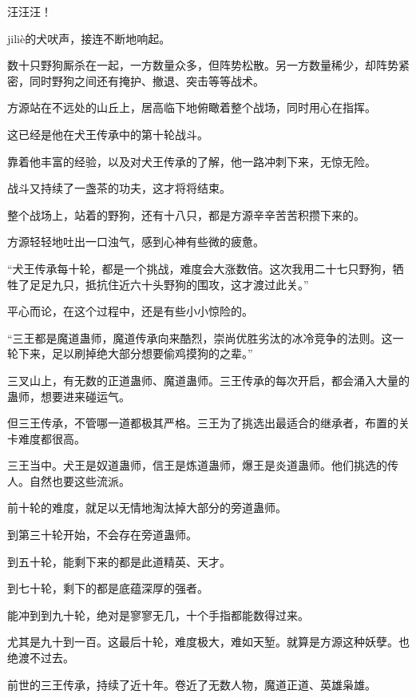 
\begin{this_body}

汪汪汪！

jiliè的犬吠声，接连不断地响起。

数十只野狗厮杀在一起，一方数量众多，但阵势松散。另一方数量稀少，却阵势紧密，同时野狗之间还有掩护、撤退、突击等等战术。

方源站在不远处的山丘上，居高临下地俯瞰着整个战场，同时用心在指挥。

这已经是他在犬王传承中的第十轮战斗。

靠着他丰富的经验，以及对犬王传承的了解，他一路冲刺下来，无惊无险。

战斗又持续了一盏茶的功夫，这才将将结束。

整个战场上，站着的野狗，还有十八只，都是方源辛辛苦苦积攒下来的。

方源轻轻地吐出一口浊气，感到心神有些微的疲惫。

“犬王传承每十轮，都是一个挑战，难度会大涨数倍。这次我用二十七只野狗，牺牲了足足九只，抵抗住近六十头野狗的围攻，这才渡过此关。”

平心而论，在这个过程中，还是有些小小惊险的。

“三王都是魔道蛊师，魔道传承向来酷烈，崇尚优胜劣汰的冰冷竞争的法则。这一轮下来，足以刷掉绝大部分想要偷鸡摸狗的之辈。”

三叉山上，有无数的正道蛊师、魔道蛊师。三王传承的每次开启，都会涌入大量的蛊师，想要进来碰运气。

但三王传承，不管哪一道都极其严格。三王为了挑选出最适合的继承者，布置的关卡难度都很高。

三王当中。犬王是奴道蛊师，信王是炼道蛊师，爆王是炎道蛊师。他们挑选的传人。自然也要这些流派。

前十轮的难度，就足以无情地淘汰掉大部分的旁道蛊师。

到第三十轮开始，不会存在旁道蛊师。

到五十轮，能剩下来的都是此道精英、天才。

到七十轮，剩下的都是底蕴深厚的强者。

能冲到到九十轮，绝对是寥寥无几，十个手指都能数得过来。

尤其是九十到一百。这最后十轮，难度极大，难如天堑。就算是方源这种妖孽。也绝渡不过去。

前世的三王传承，持续了近十年。卷近了无数人物，魔道正道、英雄枭雄。


\end{this_body}
